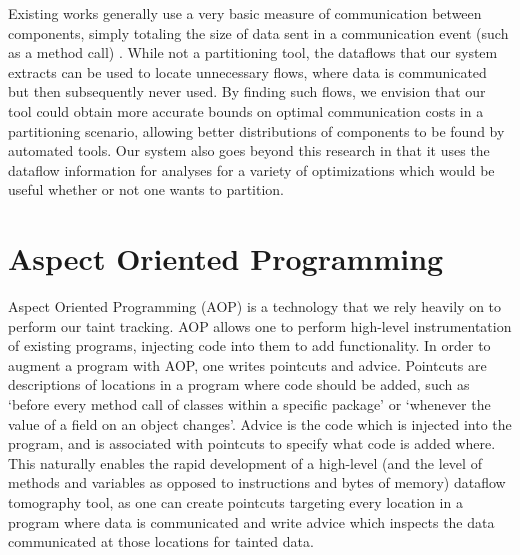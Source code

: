 \documentclass[msc,oneside]{ubcthesis}
\begin{document}
	Existing works generally use a very basic measure of communication between components, simply totaling the size of data sent in a communication event (such as a method call) \cite{Nahrstedt2003} \cite{Ou2007} \cite{Hajjat2010} \cite{Chun2010} \cite{Chun2011}. While not a partitioning tool, the dataflows that our system extracts can be used to locate unnecessary flows, where data is communicated but then subsequently never used. By finding such flows, we envision that our tool could obtain more accurate bounds on optimal communication costs in a partitioning scenario, allowing better distributions of components to be found by automated tools. Our system also goes beyond this research in that it uses the dataflow information for analyses for a variety of optimizations which would be useful whether or not one wants to partition.
		
\section{Aspect Oriented Programming}
	Aspect Oriented Programming (AOP) \cite{Kiczales1997} is a technology that we rely heavily on to perform our taint tracking. AOP allows one to perform high-level instrumentation of existing programs, injecting code into them to add functionality. In order to augment a program with AOP, one writes pointcuts and advice. Pointcuts are descriptions of locations in a program where code should be added, such as `before every method call of classes within a specific package' or `whenever the value of a field on an object changes'. Advice is the code which is injected into the program, and is associated with pointcuts to specify what code is added where. This naturally enables the rapid development of a high-level (and the level of methods and variables as opposed to instructions and bytes of memory) dataflow tomography tool, as one can create pointcuts targeting every location in a program where data is communicated and write advice which inspects the data communicated at those locations for tainted data.
\end{document}
